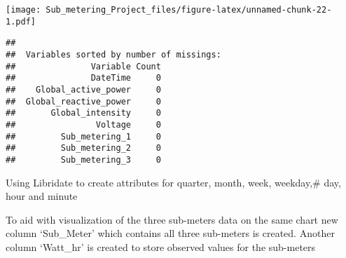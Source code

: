 \documentclass[]{article}
\newenvironment{Shaded}{\begin{snugshade}}{\end{snugshade}}
\newcommand{\KeywordTok}[1]{\textcolor[rgb]{0.13,0.29,0.53}{\textbf{#1}}}
\newcommand{\NormalTok}[1]{#1}
\newcommand{\OperatorTok}[1]{\textcolor[rgb]{0.81,0.36,0.00}{\textbf{#1}}}
\newcommand{\StringTok}[1]{\textcolor[rgb]{0.31,0.60,0.02}{#1}}
\begin{document}
\texttt{[image: Sub\_metering\_Project\_files/figure-latex/unnamed-chunk-22-1.pdf]}

\begin{verbatim}
## 
##  Variables sorted by number of missings: 
##               Variable Count
##               DateTime     0
##    Global_active_power     0
##  Global_reactive_power     0
##       Global_intensity     0
##                Voltage     0
##         Sub_metering_1     0
##         Sub_metering_2     0
##         Sub_metering_3     0
\end{verbatim}

Using Libridate to create attributes for quarter, month, week,
weekday,\# day, hour and minute

\begin{Shaded}
\end{Shaded}

To aid with visualization of the three sub-meters data on the same chart
new column `Sub\_Meter' which contains all three sub-meters is created.
Another column `Watt\_hr' is created to store observed values for the
sub-meters

\begin{Shaded}
\end{Shaded}
\end{document}
